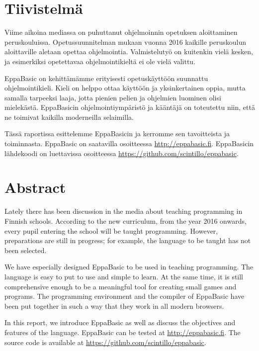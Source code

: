 
\section*{Tiivistelmä}
Viime aikoina mediassa on puhuttanut
ohjelmoinnin opetuksen aloittaminen
peruskouluissa.
Opetussuunnitelman mukaan vuonna
2016 kaikille peruskoulun aloittaville
aletaan opettaa ohjelmointia.
Valmistelutyö on kuitenkin vielä kesken,
ja esimerkiksi opetettavaa
ohjelmointikieltä ei ole vielä valittu.

EppaBasic on kehittämämme erityisesti
opetuskäyttöön suunnattu
ohjelmointikieli.
Kieli on helppo ottaa käyttöön
ja yksinkertainen oppia,
mutta samalla tarpeeksi laaja,
jotta pienien pelien ja ohjelmien
luominen olisi mielekästä.
EppaBasicin ohjelmointiympäristö ja kääntäjä
on toteutettu niin, että ne toimivat
kaikilla moderneilla selaimilla.

Tässä raportissa esittelemme EppaBasicin
ja kerromme sen tavoitteista ja toiminnasta.
EppaBasic on saatavilla osoitteessa \url{http://eppabasic.fi}.
EppaBasicin lähdekoodi on luettavissa
osoitteessa \url{https://github.com/scintillo/eppabasic}.

\vspace{50px}

\section*{Abstract}
Lately there has been discussion
in the media
about teaching programming in
Finnish schools.
According to the new curriculum,
from the year 2016 onwards,
every pupil entering the school
will be taught programming.
However, preparations
are still in progress;
for example, the language to
be taught has not been selected.

We have especially designed EppaBasic to be
used in teaching programming.
The language is easy to put to use
and simple to learn.
At the same time, it is still
comprehensive enough to be
a meaningful tool for creating
small games and programs.
The programming environment
and the compiler of EppaBasic
have been put together in such
a way that they work in all
modern browsers.

In this report, we introduce EppaBasic
as well as discuss the objectives
and features of the language.
EppaBasic can be tested at
\url{http://eppabasic.fi}.
The source code is available at
\url{https://github.com/scintillo/eppabasic}.